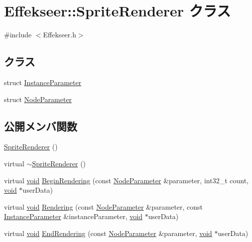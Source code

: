 \hypertarget{class_effekseer_1_1_sprite_renderer}{}\section{Effekseer\+:\+:Sprite\+Renderer クラス}
\label{class_effekseer_1_1_sprite_renderer}


{\ttfamily \#include $<$Effekseer.\+h$>$}

\subsection*{クラス}
\begin{DoxyCompactItemize}
\item 
struct \mbox{\hyperlink{struct_effekseer_1_1_sprite_renderer_1_1_instance_parameter}{Instance\+Parameter}}
\item 
struct \mbox{\hyperlink{struct_effekseer_1_1_sprite_renderer_1_1_node_parameter}{Node\+Parameter}}
\end{DoxyCompactItemize}
\subsection*{公開メンバ関数}
\begin{DoxyCompactItemize}
\item 
\mbox{\hyperlink{class_effekseer_1_1_sprite_renderer_ac56cc2377fc39a769052bc4e0e8c1d8d}{Sprite\+Renderer}} ()
\item 
virtual \mbox{\hyperlink{class_effekseer_1_1_sprite_renderer_ab5a1e3fbca9284f9169ce779bcf846cb}{$\sim$\+Sprite\+Renderer}} ()
\item 
virtual \mbox{\hyperlink{namespace_effekseer_ab34c4088e512200cf4c2716f168deb56}{void}} \mbox{\hyperlink{class_effekseer_1_1_sprite_renderer_a2ef6a8ea38ad412d813d1d02aec03070}{Begin\+Rendering}} (const \mbox{\hyperlink{struct_effekseer_1_1_sprite_renderer_1_1_node_parameter}{Node\+Parameter}} \&parameter, int32\+\_\+t count, \mbox{\hyperlink{namespace_effekseer_ab34c4088e512200cf4c2716f168deb56}{void}} $\ast$user\+Data)
\item 
virtual \mbox{\hyperlink{namespace_effekseer_ab34c4088e512200cf4c2716f168deb56}{void}} \mbox{\hyperlink{class_effekseer_1_1_sprite_renderer_a8e3f9a32bb103082e32a754fd689bbef}{Rendering}} (const \mbox{\hyperlink{struct_effekseer_1_1_sprite_renderer_1_1_node_parameter}{Node\+Parameter}} \&parameter, const \mbox{\hyperlink{struct_effekseer_1_1_sprite_renderer_1_1_instance_parameter}{Instance\+Parameter}} \&instance\+Parameter, \mbox{\hyperlink{namespace_effekseer_ab34c4088e512200cf4c2716f168deb56}{void}} $\ast$user\+Data)
\item 
virtual \mbox{\hyperlink{namespace_effekseer_ab34c4088e512200cf4c2716f168deb56}{void}} \mbox{\hyperlink{class_effekseer_1_1_sprite_renderer_a077dde1bafb304138dc929f607e8fb49}{End\+Rendering}} (const \mbox{\hyperlink{struct_effekseer_1_1_sprite_renderer_1_1_node_parameter}{Node\+Parameter}} \&parameter, \mbox{\hyperlink{namespace_effekseer_ab34c4088e512200cf4c2716f168deb56}{void}} $\ast$user\+Data)
\end{DoxyCompactItemize}


